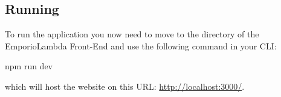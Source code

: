 \subsection{Running}
To run the application you now need to move to the directory of the EmporioLambda Front-End and use the following command in your CLI:
\begin{center}
npm run dev
\end{center}
which will host the website on this URL: \url{http://localhost:3000/}.